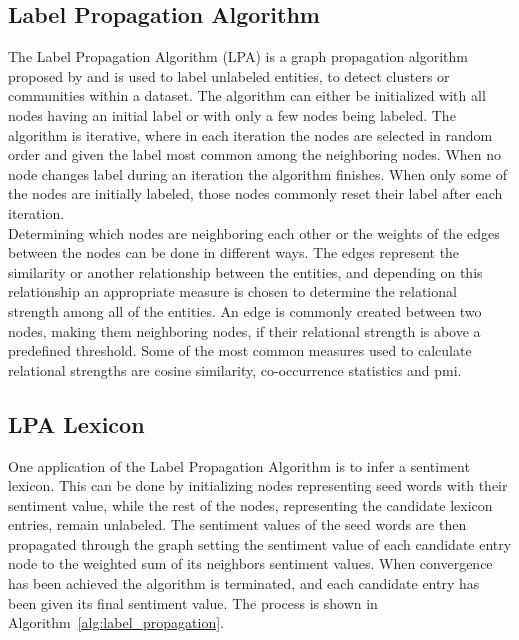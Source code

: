 \subsection{Label Propagation Algorithm}
\label{sec:label_propagation_algorithm}
The Label Propagation Algorithm (LPA) is a graph propagation algorithm proposed by \cite{Zhu02learningfrom} and is used to label unlabeled entities, to detect clusters or communities within a dataset. The algorithm can either be initialized with all nodes having an initial label or with only a few nodes being labeled. The algorithm is iterative, where in each iteration the nodes are selected in random order and given the label most common among the neighboring nodes. When no node changes label during an iteration the algorithm finishes. When only some of the nodes are initially labeled, those nodes commonly reset their label after each iteration.\\

Determining which nodes are neighboring each other or the weights of the edges between the nodes can be done in different ways. The edges represent the similarity or another relationship between the entities, and depending on this relationship an appropriate measure is chosen to determine the relational strength among all of the entities. An edge is commonly created between two nodes, making them neighboring nodes, if their relational strength is above a predefined threshold. Some of the most common measures used to calculate relational strengths are cosine similarity, co-occurrence statistics and \ac{pmi}. \\

\subsection*{LPA Lexicon}
One application of the Label Propagation Algorithm is to infer a sentiment lexicon. This can be done by initializing nodes representing seed words with their sentiment value, while the rest of the nodes, representing the candidate lexicon entries, remain unlabeled. The sentiment values of the seed words are then propagated through the graph setting the sentiment value of each candidate entry node to the weighted sum of its neighbors sentiment values. When convergence has been achieved the algorithm is terminated, and each candidate entry has been given its final sentiment value. The process is shown in Algorithm~\ref{alg:label_propagation}. \\

